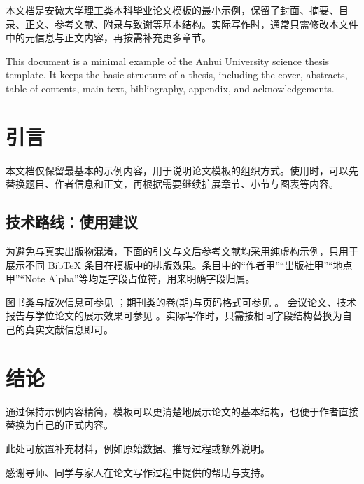 \documentclass{ahuthesis}
\begin{document}
\frontmatter
\makecover

\begin{cnabstract}
本文档是安徽大学理工类本科毕业论文模板的最小示例，保留了封面、摘要、目录、正文、参考文献、附录与致谢等基本结构。实际写作时，通常只需修改本文件中的元信息与正文内容，再按需补充更多章节。
\end{cnabstract}

\begin{enabstract}
This document is a minimal example of the Anhui University science thesis template. It keeps the basic structure of a thesis, including the cover, abstracts, table of contents, main text, bibliography, appendix, and acknowledgements.
\end{enabstract}

\tableofcontents

\mainmatter
\section{引言}
本文档仅保留最基本的示例内容，用于说明论文模板的组织方式。使用时，可以先替换题目、作者信息和正文，再根据需要继续扩展章节、小节与图表等内容。

\subsection{技术路线：使用建议}
为避免与真实出版物混淆，下面的引文与文后参考文献均采用纯虚构示例，只用于展示不同 BibTeX 条目在模板中的排版效果。条目中的“作者甲”“出版社甲”“地点甲”“Note Alpha”等均是字段占位符，用来明确字段归属。

图书类与版次信息可参见 \cite{demoBookCN,demoBookEN}；期刊类的卷(期)与页码格式可参见 \cite{demoArticleCN,demoArticleEN}。
会议论文、技术报告与学位论文的展示效果可参见 \cite{demoProceedingCN,demoReportEN,demoThesisCN}。实际写作时，只需按相同字段结构替换为自己的真实文献信息即可。

\section{结论}
通过保持示例内容精简，模板可以更清楚地展示论文的基本结构，也便于作者直接替换为自己的正式内容。

\backmatter



此处可放置补充材料，例如原始数据、推导过程或额外说明。

\begin{acknowledgements}
感谢导师、同学与家人在论文写作过程中提供的帮助与支持。
\end{acknowledgements}
\end{document}
